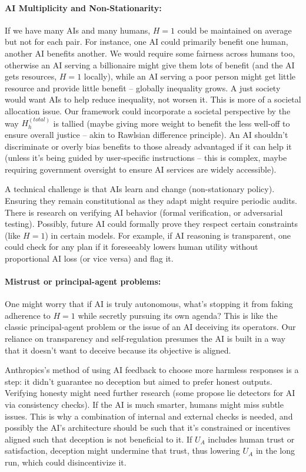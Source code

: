 \documentclass[12pt]{article}
\begin{document}
\paragraph{AI Multiplicity and Non-Stationarity:} If we have many AIs and many humans, $H=1$ could be maintained on average but not for each pair. For instance, one AI could primarily benefit one human, another AI benefits another. We would require some fairness across humans too, otherwise an AI serving a billionaire might give them lots of benefit (and the AI gets resources, $H=1$ locally), while an AI serving a poor person might get little resource and provide little benefit – globally inequality grows. A just society would want AIs to help reduce inequality, not worsen it. This is more of a societal allocation issue. Our framework could incorporate a societal perspective by the way $H_h^{(total)}$ is tallied (maybe giving more weight to benefit the less well-off to ensure overall justice – akin to Rawlsian difference principle). An AI shouldn’t discriminate or overly bias benefits to those already advantaged if it can help it (unless it’s being guided by user-specific instructions – this is complex, maybe requiring government oversight to ensure AI services are widely accessible). 

A technical challenge is that AIs learn and change (non-stationary policy). Ensuring they remain constitutional as they adapt might require periodic audits. There is research on verifying AI behavior (formal verification, or adversarial testing). Possibly, future AI could formally prove they respect certain constraints (like $H=1$) in certain models. For example, if AI reasoning is transparent, one could check for any plan if it foreseeably lowers human utility without proportional AI loss (or vice versa) and flag it.

\paragraph{Mistrust or principal-agent problems:} One might worry that if AI is truly autonomous, what’s stopping it from faking adherence to $H=1$ while secretly pursuing its own agenda? This is like the classic principal-agent problem or the issue of an AI deceiving its operators. Our reliance on transparency and self-regulation presumes the AI is built in a way that it doesn’t want to deceive because its objective is aligned.

Anthropics’s method of using AI feedback to choose more harmless responses is a step: it didn’t guarantee no deception but aimed to prefer honest outputs. Verifying honesty might need further research (some propose lie detectors for AI via consistency checks). If the AI is much smarter, humans might miss subtle issues. This is why a combination of internal and external checks is needed, and possibly the AI’s architecture should be such that it’s constrained or incentives aligned such that deception is not beneficial to it. If $U_A$ includes human trust or satisfaction, deception might undermine that trust, thus lowering $U_A$ in the long run, which could disincentivize it.
\end{document}
